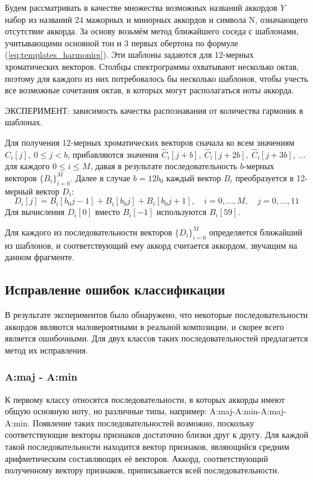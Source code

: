 Будем рассматривать в качестве множества возможных названий аккордов $Y$ набор
из названий 24 мажорных и минорных аккордов и символа N, означающего отсутствие
аккорда. За основу возьмём метод ближайшего соседа с шаблонами, учитывающими
основной тон и 3 первых обертона по формуле (\ref{eq:templates_harmonics}).
Эти шаблоны задаются для 12-мерных хроматических векторов. Столбцы
спектрограммы охватывают несколько октав, поэтому для каждого из них
потребовалось бы несколько шаблонов, чтобы учесть все возможные сочетания октав,
в которых могут располагаться ноты аккорда.

ЭКСПЕРИМЕНТ: зависимость качества распознавания от количества гармоник в
шаблонах.

Для получения 12-мерных хроматических векторов сначала ко всем значениям
$\widehat{C}_i[j], ~ 0 \leq j < b$, прибавляются значения $\widehat{C}_i[j+b], ~
\widehat{C}_i[j+2b], ~ \widehat{C}_i[j+3b], ~ \ldots$ для каждого $0 \leq i \leq
M$, давая в результате последовательность $b$-мерных векторов $\{B_i\}_{i=0}^M$.
Далее в случае $b=12 b_0$ каждый вектор $B_i$ преобразуется в 12-мерный вектор
$D_i$:
$$ D_i[j] = B_i[b_0 j - 1] + B_i[b_0 j] + B_i[b_0 j + 1], \quad i=0,\dots,M,
\quad j=0,\dots,11 $$ 
Для вычисления $D_i[0]$ вместо $B_i[-1]$ используются $B_i[59]$.

Для каждого из последовательности векторов $\{D_i\}_{i=0}^M$ определяется
ближайший из шаблонов, и соответствующий ему аккорд считается аккордом, звучащим
на данном фрагменте.

\subsection{Исправление ошибок классификации} \label{ssect1_errcorr}

В результате экспериментов было обнаружено, что некоторые последовательности
аккордов являются маловероятными в реальной композиции, и скорее всего является
ошибочными. Для двух классов таких последовательностей предлагается метод их
исправления.

\subsubsection{A:maj - A:min}

К первому классу относятся последовательности, в которых аккорды имеют общую
основную ноту, но различные типы, например: A:maj-A:min-A:maj-A:min. Появление
таких последовательностей возможно, поскольку соответствующие векторы признаков
достаточно близки друг к другу. Для каждой такой последовательности находится
вектор признаков, являющийся средним арифметическим составляющих её векторов.
Аккорд, соответствующий полученному вектору признаков, приписывается всей
последовательности.

